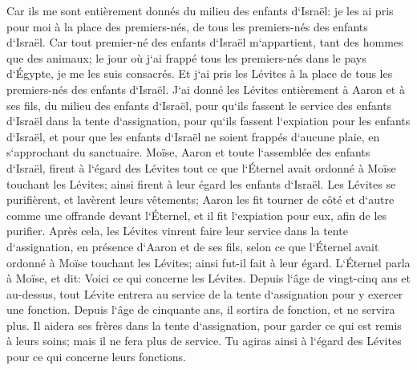 \verse Car ils me sont entièrement donnés du milieu des enfants d`Israël: je les ai pris pour moi à la place des premiers-nés, de tous les premiers-nés des enfants d`Israël. 
\verse Car tout premier-né des enfants d`Israël m`appartient, tant des hommes que des animaux; le jour où j`ai frappé tous les premiers-nés dans le pays d`Égypte, je me les suis consacrés. 
\verse Et j`ai pris les Lévites à la place de tous les premiers-nés des enfants d`Israël. 
\verse J`ai donné les Lévites entièrement à Aaron et à ses fils, du milieu des enfants d`Israël, pour qu`ils fassent le service des enfants d`Israël dans la tente d`assignation, pour qu`ils fassent l`expiation pour les enfants d`Israël, et pour que les enfants d`Israël ne soient frappés d`aucune plaie, en s`approchant du sanctuaire. 
\verse Moïse, Aaron et toute l`assemblée des enfants d`Israël, firent à l`égard des Lévites tout ce que l`Éternel avait ordonné à Moïse touchant les Lévites; ainsi firent à leur égard les enfants d`Israël. 
\verse Les Lévites se purifièrent, et lavèrent leurs vêtements; Aaron les fit tourner de côté et d`autre comme une offrande devant l`Éternel, et il fit l`expiation pour eux, afin de les purifier. 
\verse Après cela, les Lévites vinrent faire leur service dans la tente d`assignation, en présence d`Aaron et de ses fils, selon ce que l`Éternel avait ordonné à Moïse touchant les Lévites; ainsi fut-il fait à leur égard. 
\verse L`Éternel parla à Moïse, et dit: 
\verse Voici ce qui concerne les Lévites. Depuis l`âge de vingt-cinq ans et au-dessus, tout Lévite entrera au service de la tente d`assignation pour y exercer une fonction. 
\verse Depuis l`âge de cinquante ans, il sortira de fonction, et ne servira plus. 
\verse Il aidera ses frères dans la tente d`assignation, pour garder ce qui est remis à leurs soins; mais il ne fera plus de service. Tu agiras ainsi à l`égard des Lévites pour ce qui concerne leurs fonctions. 


